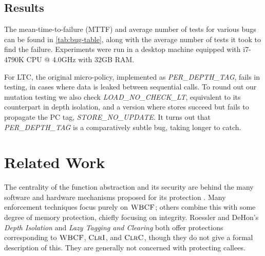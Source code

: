 \documentclass[10pt,conference]{ieeetran}%
\theoremstyle{definition}
\begin{document}
\subsection{Results}

The mean-time-to-failure (MTTF) and average number of tests for various bugs can be found in
\cref{tab:bug-table}, along with the average number of tests
it took to find the failure. Experiments were run in a desktop
machine equipped with i7-4790K CPU @ 4.0GHz with 32GB RAM.

For LTC, the original micro-policy, implemented as {\em PER\_DEPTH\_TAG},
fails in testing, in cases where data is leaked between sequential calls.
To round out our mutation testing we also check {\em LOAD\_NO\_CHECK\_LT},
equivalent to its counterpart in depth isolation,
and a version where stores succeed but fails to propagate the PC tag, {\em STORE\_NO\_UPDATE}.
It turns out that {\em PER\_DEPTH\_TAG} is a comparatively subtle bug,
taking longer to catch.


\section{Related Work}
\label{sec:relwork}

The centrality of the function abstraction and its security are behind the
many software and hardware mechanisms proposed for its protection
\cite{Cowan+98, NagarakatteZMZ09, NagarakatteZMZ10, DeviettiBMZ08,
Kuznetsov+14, Dang+15, Shanbhogue+19, Woodruff+14, Chisnall+15,
SkorstengaardLocal, SkorstengaardSTKJFP, Georges22:TempsDesCerises,
DBLP:conf/sp/RoesslerD18, Gollapudi+23}.
%
Many enforcement techniques focus purely on \(\textnormal{\sc WBCF}\);
others combine this with some degree of memory protection,
chiefly focusing on integrity.
%
Roessler and DeHon's {\it Depth Isolation} and {\it Lazy Tagging and Clearing}
\cite{DBLP:conf/sp/RoesslerD18} both offer protections corresponding to
\(\textnormal{\sc WBCF}\), \(\textnormal{\sc ClrI}\), and \(\textnormal{\sc ClrC}\), though they do not give a formal description
of this. They are generally not concerned with protecting callees.
\end{document}
